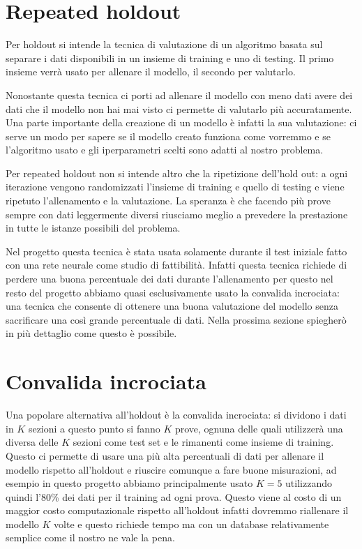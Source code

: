 \documentclass[a4paper,12pt]{report}
\begin{document}
\section{Repeated holdout}
Per holdout si intende la tecnica di valutazione di un algoritmo basata sul
separare i dati disponibili in un insieme di training e uno di testing. Il primo
insieme verrà usato per allenare il modello, il secondo per valutarlo.

Nonostante questa tecnica ci porti ad allenare il modello con meno dati avere
dei dati che il modello non hai mai visto ci permette di valutarlo più
accuratamente. Una parte importante della creazione di un modello è infatti la
sua valutazione: ci serve un modo per sapere se il modello creato funziona come
vorremmo e se l'algoritmo usato e gli iperparametri scelti sono adatti al nostro
problema.

Per repeated holdout non si intende altro che la ripetizione dell'hold out: a
ogni iterazione vengono randomizzati l'insieme di training e quello di testing e
viene ripetuto l'allenamento e la valutazione. La speranza è che facendo più
prove sempre con dati leggermente diversi riusciamo meglio a prevedere la
prestazione in tutte le istanze possibili del problema.

Nel progetto questa tecnica è stata usata solamente durante il test iniziale
fatto con una rete neurale come studio di fattibilità. Infatti questa tecnica
richiede di perdere una buona percentuale dei dati durante l'allenamento per
questo nel resto del progetto abbiamo quasi esclusivamente usato la convalida
incrociata: una tecnica che consente di ottenere una buona valutazione del
modello senza sacrificare una così grande percentuale di dati. Nella prossima
sezione spiegherò in più dettaglio come questo è possibile.

\section{Convalida incrociata}

Una popolare alternativa all'holdout è la convalida incrociata: si dividono i
dati in $K$ sezioni a questo punto si fanno $K$ prove, ognuna delle quali
utilizzerà una diversa delle $K$ sezioni come test set e le rimanenti come
insieme di training. Questo ci permette di usare una più alta percentuali di
dati per allenare il modello rispetto all'holdout e riuscire comunque a fare
buone misurazioni, ad esempio in questo progetto abbiamo principalmente usato
$K=5$ utilizzando quindi l'80\% dei dati per il training ad ogni prova. Questo
viene al costo di un maggior costo computazionale rispetto all'holdout infatti
dovremmo riallenare il modello $K$ volte e questo richiede tempo ma con un
database relativamente semplice come il nostro ne vale la pena.
\end{document}
